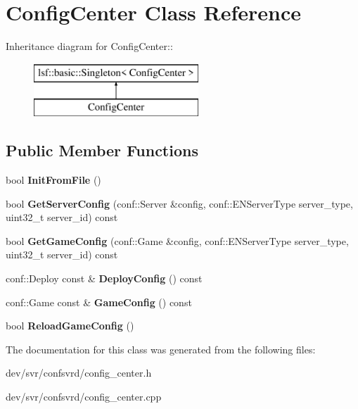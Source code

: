 \hypertarget{classConfigCenter}{
\section{ConfigCenter Class Reference}
\label{classConfigCenter}
}
Inheritance diagram for ConfigCenter::\begin{figure}[H]
\begin{center}
\leavevmode
\includegraphics[height=2cm]{classConfigCenter}
\end{center}
\end{figure}
\subsection*{Public Member Functions}
\begin{DoxyCompactItemize}
\item 
\hypertarget{classConfigCenter_aa3c253cbd4888920e57ea42dae33c3e6}{
bool {\bfseries InitFromFile} ()}
\label{classConfigCenter_aa3c253cbd4888920e57ea42dae33c3e6}

\item 
\hypertarget{classConfigCenter_a550884866b26e3aa21a2290346a8c5cf}{
bool {\bfseries GetServerConfig} (conf::Server \&config, conf::ENServerType server\_\-type, uint32\_\-t server\_\-id) const }
\label{classConfigCenter_a550884866b26e3aa21a2290346a8c5cf}

\item 
\hypertarget{classConfigCenter_a8d3cdeb9b191f9c9b4373e6f09c92bad}{
bool {\bfseries GetGameConfig} (conf::Game \&config, conf::ENServerType server\_\-type, uint32\_\-t server\_\-id) const }
\label{classConfigCenter_a8d3cdeb9b191f9c9b4373e6f09c92bad}

\item 
\hypertarget{classConfigCenter_a0a3e9acfeefd5d4d3832848bda4b3b9a}{
conf::Deploy const \& {\bfseries DeployConfig} () const }
\label{classConfigCenter_a0a3e9acfeefd5d4d3832848bda4b3b9a}

\item 
\hypertarget{classConfigCenter_a1e1a4fc15f657f955586107a193ef60d}{
conf::Game const \& {\bfseries GameConfig} () const }
\label{classConfigCenter_a1e1a4fc15f657f955586107a193ef60d}

\item 
\hypertarget{classConfigCenter_a5c85fdcc29de29aff93ab1eb04ca74f2}{
bool {\bfseries ReloadGameConfig} ()}
\label{classConfigCenter_a5c85fdcc29de29aff93ab1eb04ca74f2}

\end{DoxyCompactItemize}


The documentation for this class was generated from the following files:\begin{DoxyCompactItemize}
\item 
dev/svr/confsvrd/config\_\-center.h\item 
dev/svr/confsvrd/config\_\-center.cpp\end{DoxyCompactItemize}
